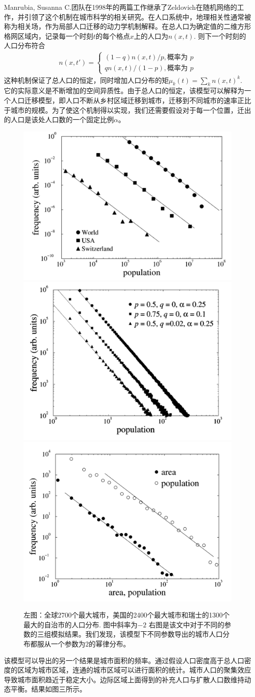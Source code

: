 Manrubia, Susanna C.团队在1998年的两篇工作\cite{PhysRevE.58.295, PhysRevLett.79.523}继承了Zeldovich在随机网络的工作，并引领了这个机制在城市科学的相关研究。在人口系统中，地理相关性通常被称为相关场，作为局部人口迁移的动力学机制解释。在总人口为确定值的二维方形格网区域内，记录每一个时刻$t$的每个格点$x$上的人口为$n(x,t)$. 则下一个时刻的人口分布符合\begin{align}
    n(x,t') = \begin{cases}
        (1-q)n(x,t)/p , \text{概率为 } p\\
        qn(x,t)/(1-p) , \text{概率为 } p
    \end{cases}
\end{align}这种机制保证了总人口的恒定，同时增加人口分布的矩$\mu_k(t) = \sum_k n(x,t)^k$. 它的实际意义是不断增加的空间异质性。由于总人口的恒定，该模型可以解释为一个人口迁移模型，即人口不断从乡村区域迁移到城市，迁移到不同城市的速率正比于城市的规模。为了使这个机制得以实现，我们还需要假设对于每一个位置，迁出的人口是该处人口数的一个固定比例$\alpha$。
\begin{figure}[h]
    \centering
    \includegraphics[width = 0.3\linewidth]{pictures/roiiudreal.png}
    \includegraphics[width = 0.3\linewidth]{pictures/roiiud.png}
    \includegraphics[width = 0.3\linewidth]{pictures/roiiudarea.png}
    \caption{左图：全球2700个最大城市，美国的2400个最大城市和瑞士的1300个最大的自治市的人口分布\cite{PhysRevLett.79.523}. 图中斜率为$-2$ 右图是该文中对于不同的参数的三组模拟结果。我们发现，该模型下不同参数导出的城市人口分布都服从一个参数为$2$的幂律分布。}
\end{figure}该模型可以导出的另一个结果是城市面积的频率。通过假设人口密度高于总人口密度的区域为城市区域，连通的城市区域可以进行面积的统计。城市人口的聚集效应导致城市面积趋近于稳定大小。边际区域上面得到的补充人口与扩散人口数维持动态平衡。结果如图三所示。

